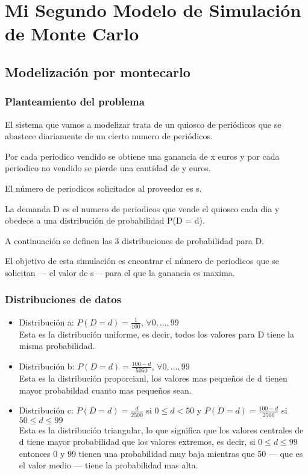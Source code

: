 \chapter{Mi Segundo Modelo de Simulación de Monte Carlo}

\section{Modelización por montecarlo}

\subsection{Planteamiento del problema}
El sistema que vamos a modelizar trata de un quiosco de periódicos que se abastece diariamente de un cierto numero de periódicos.

Por cada periodico vendido se obtiene una ganancia de x euros y por cada periodico no vendido se pierde una cantidad de y euros.

El número de periodicos solicitados al proveedor es s.

La demanda D es el numero de periodicos que vende el quiosco cada dia y obedece a una distribución de probabilidad P(D = d).

A continuación se definen las 3 distribuciones de probabilidad para D.

El objetivo de esta simulación es encontrar el número de periodicos que se solicitan --- el valor de s--- para el que la ganancia es maxima.

\subsection{Distribuciones de datos}

\begin{itemize}
	\item Distribución a: $P(D = d) = \frac{1}{100}$, $\forall 0,...,99$ \\ Esta es la distribución uniforme, es decir, todos los valores para D tiene la misma probabilidad.
	\item Distribución b: $P(D = d) = \frac{100 - d}{5050}$, $\forall 0,...,99$ \\ Esta es la distribución proporcianl, los valores mas pequeños de d tienen mayor probabildad cuanto mas pequeños sean.
	\item Distribución c: $P(D = d) = \frac{d}{2500}$ si $ 0 \leq d < 50$ y  $P(D = d) = \frac{100-d}{2500}$ si $ 50 \leq d \leq 99$ \\ Esta es la distribución triangular, lo que significa que los valores centrales de d tiene mayor probabilidad que los valores extremos, es decir, si $ 0 \leq d \leq 99$ entonces 0 y 99 tienen una probabilidad muy baja mientras que 50 --- que es el valor medio --- tiene la probabilidad mas alta.
\end{itemize}



